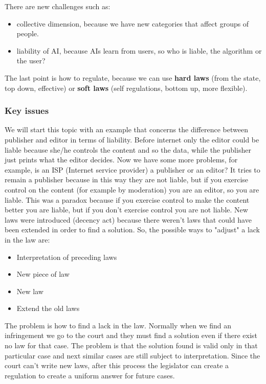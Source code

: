 There are new challenges such as:
\begin{itemize}
    \item collective dimension, because we have new categories that affect groups of people.
    \item liability of AI, because AIs learn from users, so who is liable, the algorithm or the user?
\end{itemize}

The last point is how to regulate, because we can use \textbf{hard laws} (from the state, top down, effective) or \textbf{soft laws} (self regulations, bottom up, more flexible).

\subsubsection{Key issues}
We will start this topic with an example that concerns the difference between publisher and editor in terms of liability. Before internet only the editor could be liable because she/he controls the content and so the data, while the publisher just prints what the editor decides. Now we have some more problems, for example, is an ISP (Internet service provider) a publisher or an editor? It tries to remain a publisher because in this way they are not liable, but if you exercise control on the content (for example by moderation) you are an editor, so you are liable. This was a paradox because if you exercise control to make the content better you are liable, but if you don't exercise control you are not liable. New laws were introduced (decency act) because there weren't laws that could have been extended in order to find a solution. So, the possible ways to "adjust" a lack in the law are:
\begin{itemize}
    \item Interpretation of preceding laws
    \item New piece of law
    \item New law
    \item Extend the old laws
\end{itemize}
The problem is how to find a lack in the law. Normally when we find an infringement we go to the court and they must find a solution even if there exist no law for that case. The problem is that the solution found is valid only in that particular case and next similar cases are still subject to interpretation. Since the court can't write new laws, after this process the legislator can create a regulation to create a uniform answer for future cases.

